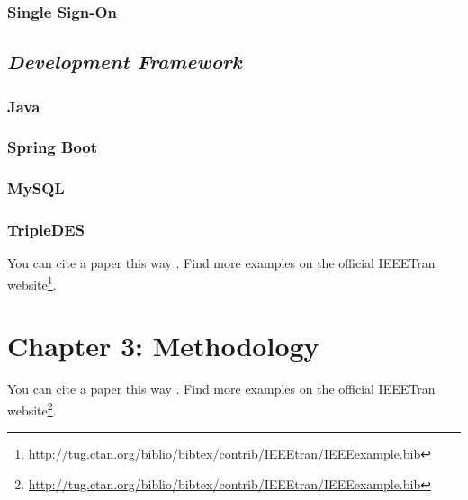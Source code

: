 \documentclass[conference, a4paper]{IEEEtran}
\begin{document}
\subsubsection{Single Sign-On}
\label{sec:sub:title}


\subsection{\textbf{\textit{{Development Framework}}}}
\label{sec:sub:title}


\subsubsection{Java}
\label{sec:sub:title}

\subsubsection{Spring Boot}
\label{sec:sub:title}

\subsubsection{MySQL}
\label{sec:sub:title}

\subsubsection{TripleDES}
\label{sec:sub:title}


\text You can cite a paper this way \cite{lecun2015deep}. 
Find more examples on the official IEEETran website\footnote{\url{http://tug.ctan.org/biblio/bibtex/contrib/IEEEtran/IEEEexample.bib}}.  




\section{Chapter 3: Methodology}
\label{sec:citation}

You can cite a paper this way \cite{lecun2015deep}. 
Find more examples on the official IEEETran website\footnote{\url{http://tug.ctan.org/biblio/bibtex/contrib/IEEEtran/IEEEexample.bib}}.  

\lipsum[1]

\end{document}
